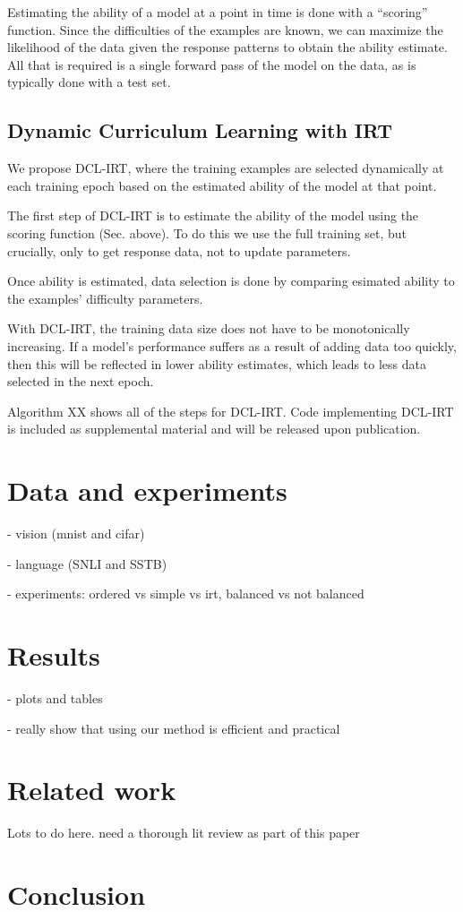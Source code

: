 \documentclass{article}
\begin{document}
Estimating the ability of a model at a point in time is done with a ``scoring'' function. 
Since the difficulties of the examples are known, we can maximize the likelihood of the data given the response patterns to obtain the ability estimate.
All that is required is a single forward pass of the model on the data, as is typically done with a test set. 

\subsection{Dynamic Curriculum Learning with IRT}

We propose DCL-IRT, where the training examples are selected dynamically at each training epoch based on the estimated ability of the model at that point.

The first step of DCL-IRT is to estimate the ability of the model using the scoring function (Sec. above). To do this we use the full training set, but crucially, only to get response data, not to update parameters. 

Once ability is estimated, data selection is done by comparing esimated ability to the examples' difficulty parameters.

With DCL-IRT, the training data size does not have to be monotonically increasing. If a model's performance suffers as a result of adding data too quickly, then this will be reflected in lower ability estimates, which leads to less data selected in the next epoch. 

Algorithm XX shows all of the steps for DCL-IRT. Code implementing DCL-IRT is included as supplemental material and will be released upon publication. 


\section{Data and experiments} 

- vision (mnist and cifar)

- language (SNLI and SSTB) 

- experiments: ordered vs simple vs irt, balanced vs not balanced 

\section{Results} 

- plots and tables 

- really show that using our method is efficient and practical 

\section{Related work}

Lots to do here. need a thorough lit review as part of this paper 

\section{Conclusion} 
\end{document}
